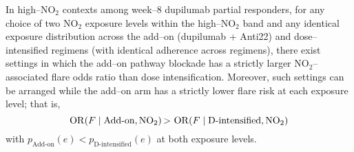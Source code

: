 ﻿\begin{theorem}\label{thm:simpson-reversal}
In high--NO$_2$ contexts among week--8 dupilumab partial responders, for any choice of two NO$_2$ exposure levels within the high--NO$_2$ band and any identical exposure distribution across the add--on (dupilumab + Anti22) and dose--intensified regimens (with identical adherence across regimens), there exist settings in which the add--on pathway blockade has a strictly larger NO$_2$--associated flare odds ratio than dose intensification. Moreover, such settings can be arranged while the add--on arm has a strictly lower flare risk at each exposure level; that is,
\[
\operatorname{OR}(F\mid \text{Add-on}, \mathrm{NO}_2) \,{>}\\[-2pt] \, \operatorname{OR}(F\mid \text{D-intensified}, \mathrm{NO}_2)
\]
with $p_{\mathrm{Add\text{-}on}}(e) < p_{\mathrm{D\text{-}intensified}}(e)$ at both exposure levels.
\end{theorem}


